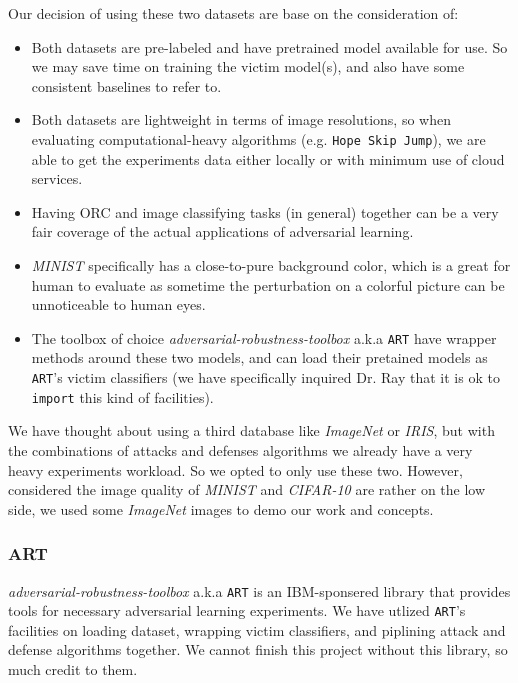 \documentclass[11pt]{article}
\newcommand{\ilc}{\texttt}
\begin{document}
	\noindent Our decision of using these two datasets are base on the consideration of:
	\begin{itemize}
		\item Both datasets are pre-labeled and have pretrained model available for use. So we may save time on training the victim model(s), and also have some consistent baselines to refer to.
		\item Both datasets are lightweight in terms of image resolutions, so when evaluating computational-heavy algorithms (e.g. \ilc{Hope Skip Jump}), we are able to get the experiments data either locally or with minimum use of cloud services.
		\item Having ORC and image classifying tasks (in general) together can be a very fair coverage of the actual applications of adversarial learning.
		\item \textit{MINIST} specifically has a close-to-pure background color, which is a great for human to evaluate as sometime the perturbation on a colorful picture can be unnoticeable to human eyes.
		\item The toolbox of choice \textit{adversarial-robustness-toolbox} a.k.a \ilc{ART} have wrapper methods around these two models, and can load their pretained models as \ilc{ART}'s victim classifiers (we have specifically inquired Dr. Ray that it is ok to \ilc{import} this kind of facilities).
	\end{itemize}
	
	We have thought about using a third database like \textit{ImageNet} or \textit{IRIS}, but with the combinations of attacks and defenses algorithms we already have a very heavy experiments workload. So we opted to only use these two. However, considered the image quality of \textit{MINIST} and \textit{CIFAR-10} are rather on the low side, we used some \textit{ImageNet} images to demo our work and concepts.
	
	\subsubsection{ART}
	
	\textit{adversarial-robustness-toolbox}\cite{cite:art} a.k.a \ilc{ART} is an IBM-sponsered library that provides tools for necessary adversarial learning experiments. We have utlized \ilc{ART}'s facilities on loading dataset, wrapping victim classifiers, and piplining attack and defense algorithms together. We cannot finish this project without this library, so much credit to them.
	
\end{document}
